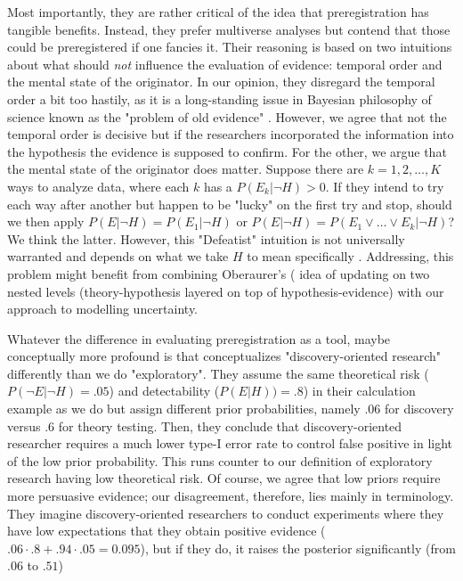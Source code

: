 \documentclass[jou,a4paper]{apa7}
\begin{document}
Most importantly, they are rather critical of the idea that preregistration has tangible benefits.
Instead, they prefer multiverse analyses but contend that those could be preregistered if one fancies it.
Their reasoning is based on two intuitions about what should \textit{not} influence the evaluation of evidence: temporal order and the mental state of the originator.
In our opinion, they disregard the temporal order a bit too hastily, as it is a long-standing issue in Bayesian philosophy of science known as the "problem of old evidence" \parencite{chiharaProblemsBayesianConfirmation1987}.
However, we agree that not the temporal order is decisive but if the researchers incorporated the information into the hypothesis the evidence is supposed to confirm.
For the other, we argue that the mental state of the originator does matter.
Suppose there are $k = 1, 2, \ldots, K$ ways to analyze data, where each $k$ has a $P(E_k | \neg H) > 0$.
If they intend to try each way after another but happen to be "lucky" on the first try and stop, should we then apply $P(E| \neg H) = P(E_1 | \neg H)$ or $P(E| \neg H) = P(E_1 \lor \ldots \lor E_k | \neg H)$?
We think the latter.
However, this "Defeatist" intuition is not universally warranted and depends on what we take $H$ to mean specifically \parencite{kotzenMultipleStudiesEvidential2013}.
Addressing, this problem might benefit from combining Oberaurer's (\citeyear{oberauerAddressingTheoryCrisis2019} idea of updating on two nested levels (theory-hypothesis layered on top of hypothesis-evidence) with our approach to modelling uncertainty.\par
Whatever the difference in evaluating preregistration as a tool, maybe conceptually more profound is that \textcite{oberauerAddressingTheoryCrisis2019} conceptualizes "discovery-oriented research" differently than we do "exploratory".
They assume the same theoretical risk ($P(\neg E| \neg H) = .05$) and detectability ($P(E| H)) = .8$) in their calculation example as we do but assign different prior probabilities, namely $.06$ for discovery versus $.6$ for theory testing.
Then, they conclude that discovery-oriented researcher requires a much lower type-I error rate to control false positive in light of the low prior probability.
This runs counter to our definition of exploratory research having low theoretical risk.
Of course, we agree that low priors require more persuasive evidence; our disagreement, therefore, lies mainly in terminology.
They imagine discovery-oriented researchers to conduct experiments where they have low expectations that they obtain positive evidence ($.06 \cdot .8 + .94 \cdot .05 = 0.095$), but if they do, it raises the posterior significantly (from $.06$ to $.51$)
\end{document}
